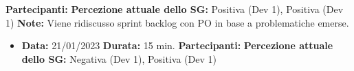 \begin{landscape}
\begin{itemize}
            \newline \textbf{Partecipanti:} \dueP \due
            \newline \textbf{Percezione attuale dello SG:} Positiva (Dev 1), Positiva (Dev 1)
            \newline \textbf{Note:} Viene ridiscusso sprint backlog con PO in base a problematiche emerse.
        \end{itemize}
        \begin{itemize}
            \item \textbf{Data:} 21/01/2023
            \newline \textbf{Durata:} 15 min.
            \newline \textbf{Partecipanti:} \due
            \newline \textbf{Percezione attuale dello SG:} Negativa (Dev 1), Positiva (Dev 1)
        \end{itemize}

        \newpage

\end{landscape}

